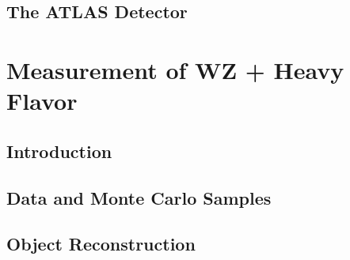 \documentclass[12pt]{report}	%
\theoremstyle{definition}
\theoremstyle{remark}
\begin{document}

\section{The ATLAS Detector}
\label{sec:atlas}


 
\chapter{Measurement of WZ + Heavy Flavor}                                                                                    
\label{part:wz}


\section{Introduction}                                                                                                      
\label{sec:intro}                                                                                                           
                                                                                                      

\section{Data and Monte Carlo Samples}
\label{sec:data}

 
\section{Object Reconstruction}
\label{sec:obj}

 
\end{document}
